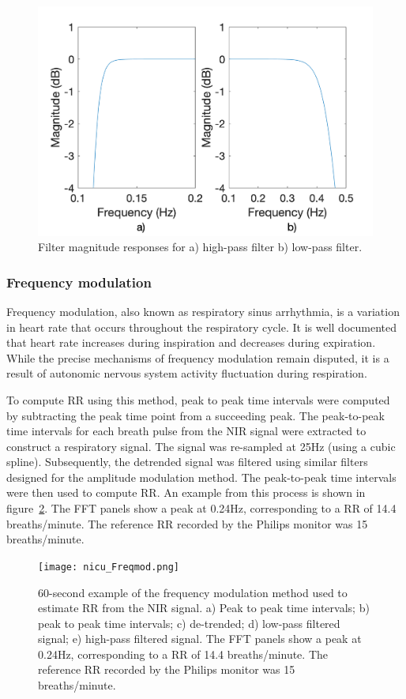 \begin{figure}
\centering
\includegraphics[width = 10 cm]{./figures/mag_resampledrr.png}
    \caption[Filter magnitude responses.]{Filter magnitude responses for a) high-pass filter b) low-pass filter.}
        \label{mag_RRresampled}
\end{figure}


\subsubsection{Frequency modulation} 

Frequency modulation, also known as respiratory sinus arrhythmia, is a variation in heart rate that occurs throughout the respiratory cycle. It is well documented that heart rate increases during inspiration and decreases during expiration. While the precise mechanisms of frequency modulation remain disputed, it is a result of autonomic nervous system activity fluctuation during respiration.

To compute RR using this method, peak to peak time intervals were computed by subtracting the peak time point from a succeeding peak. The peak-to-peak time intervals for each breath pulse from the NIR signal were extracted to construct a respiratory signal. The signal was re-sampled at 25Hz (using a cubic spline). Subsequently, the detrended signal was filtered using similar filters designed for the amplitude modulation method. The peak-to-peak time intervals were then used to compute RR. An example from this process is shown in figure~\ref{Freqmod}. The FFT panels show a peak at 0.24Hz, corresponding to a RR of 14.4 breaths/minute. The reference RR recorded by the Philips monitor was 15 breaths/minute.


\begin{figure}
    \centering
\texttt{[image: nicu\_Freqmod.png]}
    \caption [60-second example of the frequency modulation method used to estimate RR from the NIR signal.]{60-second example of the frequency modulation method used to estimate RR from the NIR signal. a) Peak to peak time intervals; b) peak to peak time intervals; c) de-trended; d) low-pass filtered signal; e) high-pass filtered signal. The FFT panels show a peak at 0.24Hz, corresponding to a RR of 14.4 breaths/minute. The reference RR recorded by the Philips monitor was 15 breaths/minute.}
    \label{Freqmod} 
\end{figure}


